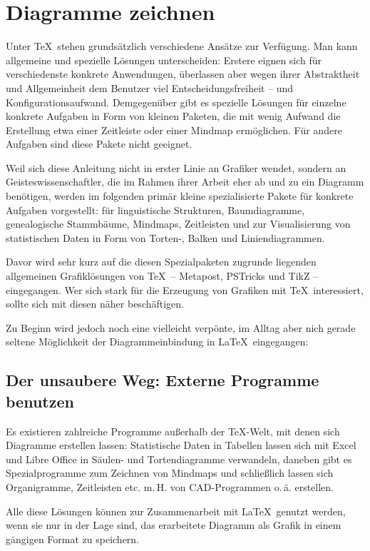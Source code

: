 
\chapter{Diagramme zeichnen}

Unter \TeX\ stehen grundsätzlich verschiedene Ansätze zur Verfügung. 
Man kann allgemeine und spezielle Lösungen unterscheiden:
Erstere eignen sich für verschiedenste konkrete Anwendungen, überlassen aber wegen ihrer Abstraktheit 
und Allgemeinheit dem Benutzer viel Entscheidungsfreiheit -- und Konfigurationsaufwand. 
Demgegenüber gibt es spezielle Lösungen für einzelne konkrete Aufgaben in Form von kleinen Paketen,
die mit wenig Aufwand die Erstellung etwa einer Zeitleiste oder einer Mindmap ermöglichen.
Für andere Aufgaben sind diese Pakete nicht geeignet.

Weil sich diese Anleitung nicht in erster Linie an Grafiker wendet, sondern an Geisteswissenschaftler,
die im Rahmen ihrer Arbeit eher ab und zu ein Diagramm benötigen, werden im folgenden primär
kleine spezialisierte Pakete für konkrete Aufgaben vorgestellt: 
für linguistische Strukturen,
Baumdiagramme,
genealogische Stammbäume,
Mindmaps,
Zeitleisten 
und zur Visualisierung von statistischen Daten in Form von Torten-, Balken und Liniendiagrammen.

Davor wird sehr kurz auf die diesen Spezialpaketen zugrunde liegenden allgemeinen Grafiklösungen
von \TeX\ -- Metapost, PSTricks und TikZ -- eingegangen. Wer sich stark für die Erzeugung von Grafiken
mit \TeX\ interessiert, sollte sich mit diesen näher beschäftigen.

Zu Beginn wird jedoch noch eine vielleicht verpönte, im Alltag aber nich gerade seltene Möglichkeit
der Diagrammeinbindung in \LaTeX\ eingegangen: 

\section{Der unsaubere Weg: Externe Programme benutzen}

Es existieren zahlreiche Programme außerhalb der \TeX -Welt, mit denen sich Diagramme erstellen 
lassen: Statistische Daten in Tabellen lassen sich mit Excel und Libre Office in Säulen- und 
Tortendiagramme verwandeln, daneben gibt es Spezialprogramme zum Zeichnen von Mindmaps
und schließlich lassen sich Organigramme, Zeitleisten etc. m.\,H. von CAD-Programmen o.\,ä.
erstellen.

Alle diese Lösungen können zur Zusammenarbeit mit \LaTeX\ genutzt werden, wenn sie nur in der 
Lage sind, das erarbeitete Diagramm als Grafik in einem gängigen Format zu speichern.

